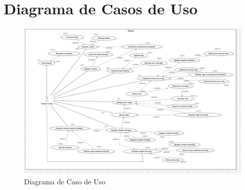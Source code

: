 \section{Diagrama de Casos de Uso}
    \begin{figure}[htbp]
        \centering
        \includegraphics[width=16.5cm]{entregable final/caso_usoSA.jpg}
        \caption{Diagrama de Caso de Uso}
        \label{fig:enter-label}
    \end{figure}